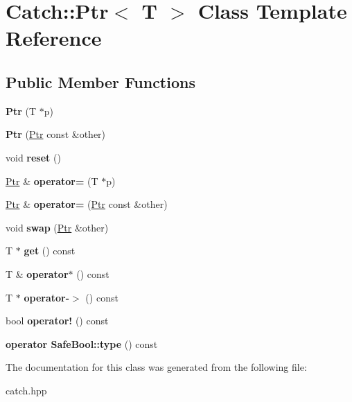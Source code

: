 \hypertarget{classCatch_1_1Ptr}{}\section{Catch\+:\+:Ptr$<$ T $>$ Class Template Reference}
\label{classCatch_1_1Ptr}
\subsection*{Public Member Functions}
\begin{DoxyCompactItemize}
\item 
\mbox{\label{classCatch_1_1Ptr_aacec063a79cd142e39040a31c6b3c40b}} 
{\bfseries Ptr} (T $\ast$p)
\item 
\mbox{\label{classCatch_1_1Ptr_ac629dd8ebe5763a37bb89e6c1d6a1771}} 
{\bfseries Ptr} (\hyperlink{classCatch_1_1Ptr}{Ptr} const \&other)
\item 
\mbox{\label{classCatch_1_1Ptr_af8d0fa7a2cd20842830b354ac31dfe5c}} 
void {\bfseries reset} ()
\item 
\mbox{\label{classCatch_1_1Ptr_a9b08c868b447d679ed201921f5c94683}} 
\hyperlink{classCatch_1_1Ptr}{Ptr} \& {\bfseries operator=} (T $\ast$p)
\item 
\mbox{\label{classCatch_1_1Ptr_af42074444c1bc6a70ebdc406a8617708}} 
\hyperlink{classCatch_1_1Ptr}{Ptr} \& {\bfseries operator=} (\hyperlink{classCatch_1_1Ptr}{Ptr} const \&other)
\item 
\mbox{\label{classCatch_1_1Ptr_a172bf8b4e71e26a5a4d92f5b02158b50}} 
void {\bfseries swap} (\hyperlink{classCatch_1_1Ptr}{Ptr} \&other)
\item 
\mbox{\label{classCatch_1_1Ptr_a2158bb2a1a21b001a2e72d4591d3e31e}} 
T $\ast$ {\bfseries get} () const
\item 
\mbox{\label{classCatch_1_1Ptr_a8d73989b1c77a1cab6152766feaa837f}} 
T \& {\bfseries operator$\ast$} () const
\item 
\mbox{\label{classCatch_1_1Ptr_acc0996cbd99f360069260a898b3f4fda}} 
T $\ast$ {\bfseries operator-\/$>$} () const
\item 
\mbox{\label{classCatch_1_1Ptr_a85c4fe6cebf2a69d0416020b65714360}} 
bool {\bfseries operator!} () const
\item 
\mbox{\label{classCatch_1_1Ptr_a102838cb25643586679e12efca26a3af}} 
{\bfseries operator Safe\+Bool\+::type} () const
\end{DoxyCompactItemize}


The documentation for this class was generated from the following file\+:\begin{DoxyCompactItemize}
\item 
catch.\+hpp\end{DoxyCompactItemize}
